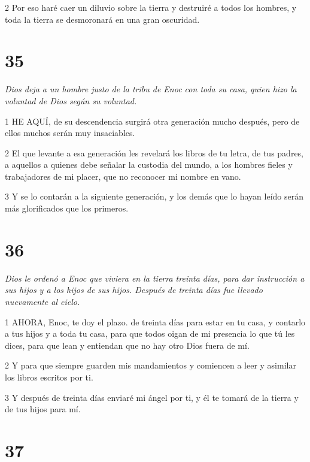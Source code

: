 \par 2 Por eso haré caer un diluvio sobre la tierra y destruiré a todos los hombres, y toda la tierra se desmoronará en una gran oscuridad.

\chapter{35}

\par \textit{Dios deja a un hombre justo de la tribu de Enoc con toda su casa, quien hizo la voluntad de Dios según su voluntad.}

\par 1 HE AQUÍ, de su descendencia surgirá otra generación mucho después, pero de ellos muchos serán muy insaciables.

\par 2 El que levante a esa generación les revelará los libros de tu letra, de tus padres, a aquellos a quienes debe señalar la custodia del mundo, a los hombres fieles y trabajadores de mi placer, que no reconocer mi nombre en vano.

\par 3 Y se lo contarán a la siguiente generación, y los demás que lo hayan leído serán más glorificados que los primeros.

\chapter{36}

\par \textit{Dios le ordenó a Enoc que viviera en la tierra treinta días, para dar instrucción a sus hijos y a los hijos de sus hijos. Después de treinta días fue llevado nuevamente al cielo.}

\par 1 AHORA, Enoc, te doy el plazo. de treinta días para estar en tu casa, y contarlo a tus hijos y a toda tu casa, para que todos oigan de mi presencia lo que tú les dices, para que lean y entiendan que no hay otro Dios fuera de mí.

\par 2 Y para que siempre guarden mis mandamientos y comiencen a leer y asimilar los libros escritos por ti.

\par 3 Y después de treinta días enviaré mi ángel por ti, y él te tomará de la tierra y de tus hijos para mí.

\chapter{37}

